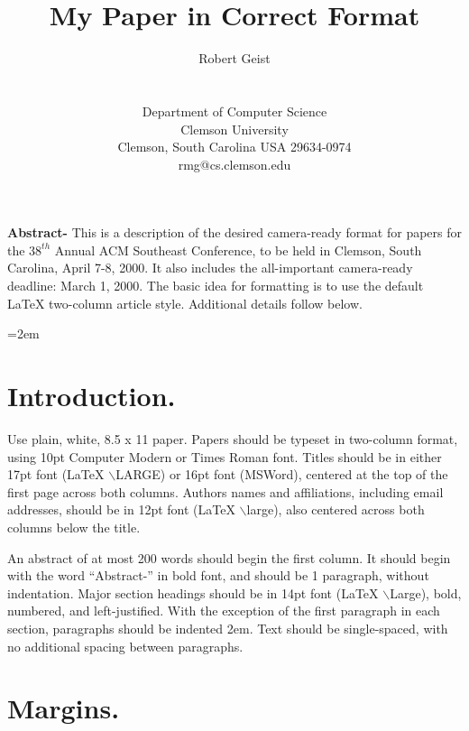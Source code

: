 \documentclass[twocolumn]{article}
\begin{document}


\thispagestyle{empty}

\title{My Paper in Correct Format}
\author{
Robert Geist \\
\quad\\
\\
Department of Computer Science \\
Clemson University \\
Clemson, South Carolina USA 29634-0974\\
rmg@cs.clemson.edu
}
\date{\quad}
\maketitle
{\small
\parskip=12pt
\parindent=0pt

{\bf Abstract-} This is a description of the desired camera-ready
format for papers for the $38^{th}$ Annual ACM Southeast Conference,
to be held in Clemson, South Carolina, April 7-8, 2000.  It also
includes the all-important camera-ready deadline: March 1, 2000. The basic
idea for formatting is to use the default LaTeX two-column article style.  
Additional details follow below.
}

\parindent=2em
\section{Introduction.}

\thispagestyle{empty}

Use plain, white, 8.5 x 11 paper.  Papers should be typeset in 
two-column format, using 10pt Computer Modern or Times Roman font.  Titles
should be in either 17pt font (LaTeX $\backslash$LARGE) or 16pt 
font (MSWord), centered at the top of the first page across both columns.  
Authors names and affiliations, including email addresses, should be in 
12pt font (LaTeX $\backslash$large), also centered across both columns 
below the title.

An abstract of at most 200 words should begin the first column.
It should begin with the word ``Abstract-'' in bold font, and
should be 1 paragraph, without indentation.  Major section headings
should be in 14pt font (LaTeX $\backslash$Large), bold, numbered, and 
left-justified.  With the exception of the first paragraph in each section, 
paragraphs should be indented 2em.  Text should be single-spaced, with no 
additional spacing between paragraphs. 

\section{Margins.}
\end{document}

